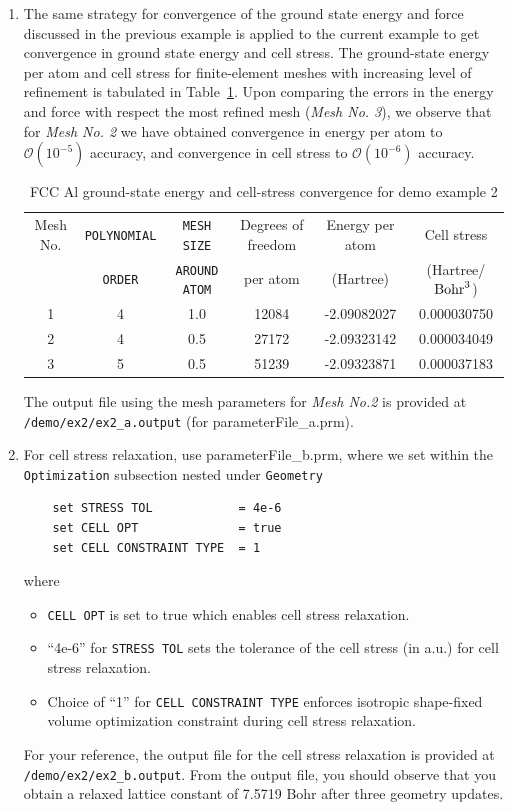 \begin{enumerate}
\item The same strategy for convergence of the ground state energy and force discussed
in the previous example is applied to the current example to get convergence in ground state energy and cell stress. 
The ground-state energy per atom and cell stress for finite-element meshes with increasing level of refinement is tabulated in Table~\ref{tab:table2}. Upon comparing the errors in the energy and force with respect the most refined mesh (\emph{Mesh No. 3}), we observe that for \emph{Mesh No. 2} we have obtained convergence in energy per atom to $\mathcal{O}(10^{-5})$ accuracy, and convergence in cell stress to $\mathcal{O}(10^{-6})$ accuracy.
\begin{table}[h!]
  \begin{center}
\small	  
    \caption{FCC Al ground-state energy and cell-stress convergence for demo example 2}
    \label{tab:table2}
    \begin{tabular}{c|c|c|c|c|c} 
	    \hline\hline
	    Mesh No. &\verb|POLYNOMIAL| &\verb|MESH SIZE| & Degrees of freedom& Energy per atom & Cell stress\\
	    &\verb|ORDER| &\verb|AROUND ATOM| & per atom  & (Hartree) & (Hartree/${\rm Bohr}^3$) \\
      \hline
	    1& 4 & 1.0 & 12084 & -2.09082027 &  0.000030750\\	    
	    2& 4 & 0.5 & 27172 & -2.09323142 &  0.000034049\\
	    3&5 & 0.5 & 51239 &  -2.09323871 &  0.000037183\\
       \hline\hline
    \end{tabular}
  \end{center}
\end{table}
The output file using the mesh parameters for \emph{Mesh No.2} is provided at \verb|/demo/ex2/ex2_a.output| (for parameterFile\_a.prm).

\item For cell stress relaxation, use parameterFile\_b.prm, where we set within the \verb|Optimization| subsection nested under \verb|Geometry|
\begin{verbatim}
    set STRESS TOL            = 4e-6
    set CELL OPT              = true
    set CELL CONSTRAINT TYPE  = 1
\end{verbatim}
where
\begin{itemize}
\item \verb|CELL OPT| is set to true which enables cell stress relaxation.  		
\item ``4e-6'' for \verb|STRESS TOL| sets the tolerance of the cell stress (in a.u.) for cell stress relaxation.
\item Choice of ``1'' for \verb|CELL CONSTRAINT TYPE| enforces isotropic shape-fixed volume optimization constraint during cell stress relaxation.
\end{itemize}
For your reference, the output file for the cell stress relaxation is provided at \verb|/demo/ex2/ex2_b.output|. From the output file, you should observe that you obtain a relaxed lattice constant of 7.5719 Bohr after three geometry updates. 
\end{enumerate}

